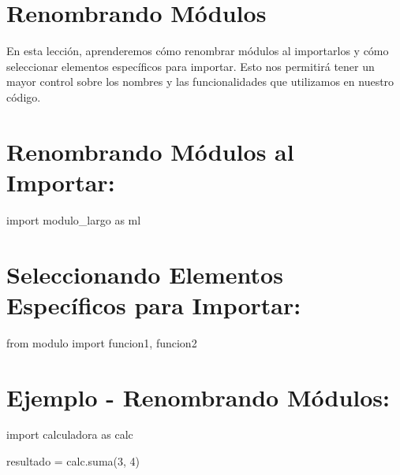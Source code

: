 \documentclass[
  a4paper,
  onepage,
  openany]{scrreprt}
\newenvironment{Shaded}{\begin{snugshade}}{\end{snugshade}}
\newcommand{\DecValTok}[1]{\textcolor[rgb]{0.68,0.00,0.00}{#1}}
\newcommand{\ImportTok}[1]{\textcolor[rgb]{0.00,0.46,0.62}{#1}}
\newcommand{\NormalTok}[1]{\textcolor[rgb]{0.00,0.23,0.31}{#1}}
\newcommand{\OperatorTok}[1]{\textcolor[rgb]{0.37,0.37,0.37}{#1}}
\begin{document}
\hypertarget{renombrando-muxf3dulos-1}{%
\section{Renombrando Módulos}\label{renombrando-muxf3dulos-1}}

En esta lección, aprenderemos cómo renombrar módulos al importarlos y
cómo seleccionar elementos específicos para importar. Esto nos permitirá
tener un mayor control sobre los nombres y las funcionalidades que
utilizamos en nuestro código.

\hypertarget{renombrando-muxf3dulos-al-importar-1}{%
\section{Renombrando Módulos al
Importar:}\label{renombrando-muxf3dulos-al-importar-1}}

\begin{Shaded}
\begin{Highlighting}[]
\ImportTok{import}\NormalTok{ modulo\_largo }\ImportTok{as}\NormalTok{ ml}
\end{Highlighting}
\end{Shaded}

\hypertarget{seleccionando-elementos-especuxedficos-para-importar-1}{%
\section{Seleccionando Elementos Específicos para
Importar:}\label{seleccionando-elementos-especuxedficos-para-importar-1}}

\begin{Shaded}
\begin{Highlighting}[]
\ImportTok{from}\NormalTok{ modulo }\ImportTok{import}\NormalTok{ funcion1, funcion2}
\end{Highlighting}
\end{Shaded}

\hypertarget{ejemplo---renombrando-muxf3dulos-1}{%
\section{Ejemplo - Renombrando
Módulos:}\label{ejemplo---renombrando-muxf3dulos-1}}

\begin{Shaded}
\begin{Highlighting}[]
\ImportTok{import}\NormalTok{ calculadora }\ImportTok{as}\NormalTok{ calc}

\NormalTok{resultado }\OperatorTok{=}\NormalTok{ calc.suma(}\DecValTok{3}\NormalTok{, }\DecValTok{4}\NormalTok{)}
\end{Highlighting}
\end{Shaded}
\end{document}
